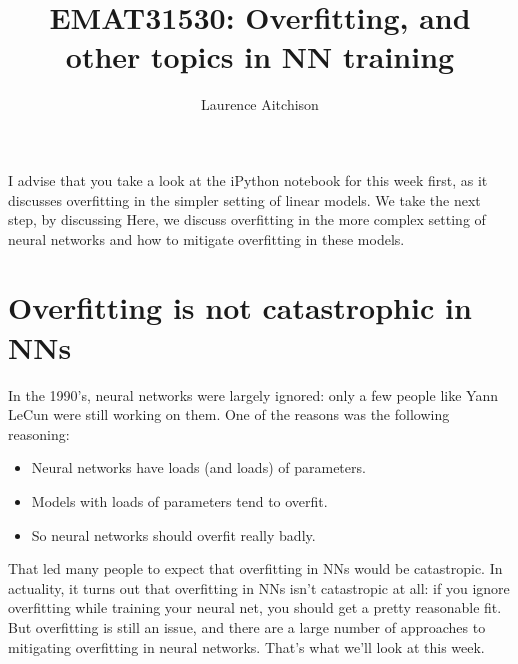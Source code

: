 \documentclass{article}
\title{EMAT31530: Overfitting, and other topics in NN training}
\author{Laurence Aitchison}
\date{}
\newcommand{\0}{\mathbf{0}}
\begin{document}
\maketitle

I advise that you take a look at the iPython notebook for this week first, as it discusses overfitting in the simpler setting of linear models.  We take the next step, by discussing Here, we discuss overfitting in the more complex setting of neural networks and how to mitigate overfitting in these models.

\section{Overfitting is not catastrophic in NNs}

In the 1990's, neural networks were largely ignored: only a few people like Yann LeCun were still working on them.
One of the reasons was the following reasoning:
\begin{itemize}
  \item Neural networks have loads (and loads) of parameters.
  \item Models with loads of parameters tend to overfit.
  \item So neural networks should overfit really badly.
\end{itemize}
That led many people to expect that overfitting in NNs would be catastropic.
In actuality, it turns out that overfitting in NNs isn't catastropic at all: if you ignore overfitting while training your neural net, you should get a pretty reasonable fit.
But overfitting is still an issue, and there are a large number of approaches to mitigating overfitting in neural networks.
That's what we'll look at this week.


\newpage
\end{document}
